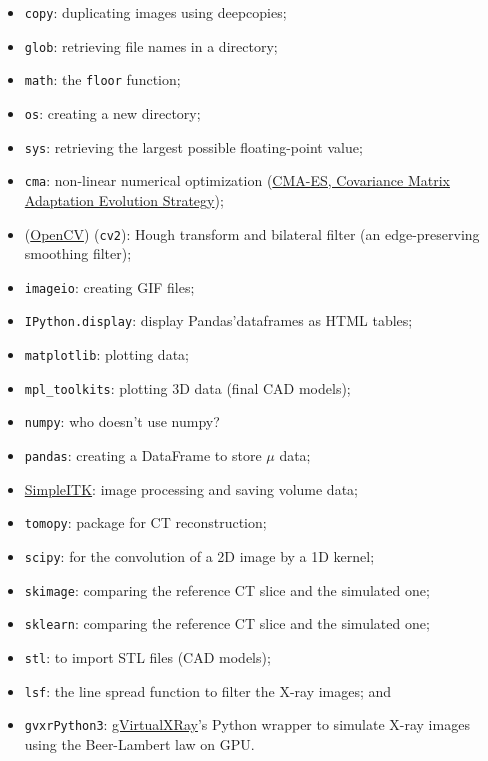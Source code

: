 \documentclass[11pt]{article}
\providecommand{\tightlist}{%
      \setlength{\itemsep}{0pt}\setlength{\parskip}{0pt}}
\begin{document}
\begin{itemize}
\tightlist
\item
  \texttt{copy}: duplicating images using deepcopies;
\item
  \texttt{glob}: retrieving file names in a directory;
\item
  \texttt{math}: the \texttt{floor} function;
\item
  \texttt{os}: creating a new directory;
\item
  \texttt{sys}: retrieving the largest possible floating-point value;
\item
  \texttt{cma}: non-linear numerical optimization
  (\href{https://github.com/CMA-ES/pycma}{CMA-ES, Covariance Matrix
  Adaptation Evolution Strategy});
\item
  (\href{https://www.opencv.org/}{OpenCV}) (\texttt{cv2}): Hough
  transform and bilateral filter (an edge-preserving smoothing filter);
\item
  \texttt{imageio}: creating GIF files;
\item
  \texttt{IPython.display}: display Pandas'dataframes as HTML tables;
\item
  \texttt{matplotlib}: plotting data;
\item
  \texttt{mpl\_toolkits}: plotting 3D data (final CAD models);
\item
  \texttt{numpy}: who doesn't use numpy?
\item
  \texttt{pandas}: creating a DataFrame to store \(\mu\) data;
\item
  \href{https://simpleitk.org/}{SimpleITK}: image processing and saving
  volume data;
\item
  \texttt{tomopy}: package for CT reconstruction;
\item
  \texttt{scipy}: for the convolution of a 2D image by a 1D kernel;
\item
  \texttt{skimage}: comparing the reference CT slice and the simulated
  one;
\item
  \texttt{sklearn}: comparing the reference CT slice and the simulated
  one;
\item
  \texttt{stl}: to import STL files (CAD models);
\item
  \texttt{lsf}: the line spread function to filter the X-ray images; and
\item
  \texttt{gvxrPython3}:
  \href{http://gvirtualxray.sourceforge.net/}{gVirtualXRay}'s Python
  wrapper to simulate X-ray images using the Beer-Lambert law on GPU.
\end{itemize}
\end{document}
